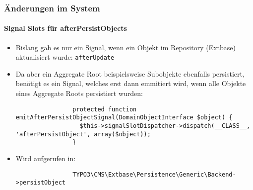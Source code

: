 \begin{frame}[fragile]
	\frametitle{Änderungen im System}
	\framesubtitle{Signal Slots für afterPersistObjects}

	\lstset{
		basicstyle=\tiny\ttfamily
	}

	\begin{itemize}

		\item Bislang gab es nur ein Signal, wenn ein Objekt im Repository (Extbase) aktualisiert wurde: \texttt{afterUpdate}

		\item Da aber ein Aggregate Root beispielsweise Subobjekte ebenfalls persistiert, benötigt es ein Signal,
			welches erst dann emmitiert wird, wenn alle Objekte eines Aggregate Roots persistiert wurden:

			\begin{lstlisting}
				protected function emitAfterPersistObjectSignal(DomainObjectInterface $object) {
				  $this->signalSlotDispatcher->dispatch(__CLASS__, 'afterPersistObject', array($object));
				}
			\end{lstlisting}

		\item Wird aufgerufen in:

			\begin{lstlisting}
				TYPO3\CMS\Extbase\Persistence\Generic\Backend->persistObject
			\end{lstlisting}

	\end{itemize}

\end{frame}                                                 


